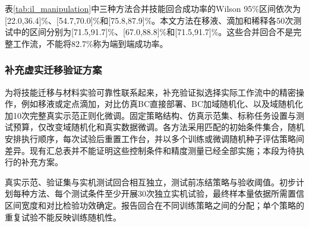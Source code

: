 \begin{table}[!t]
\renewcommand{\arraystretch}{1.3}
\caption{独立技能测试的虚实迁移IL成功率（非完整工作流）}
\label{tab:il_manipulation}
\centering
{}
\end{table}

表\ref{tab:il_manipulation}中三种方法合并技能回合成功率的Wilson 95\%区间依次为[22.0,36.4]\%、[54.7,70.0]\%和[75.8,87.9]\%。本文方法在移液、滴加和稀释各50次测试中的区间分别为[71.5,91.7]\%、[67.0,88.8]\%和[71.5,91.7]\%。这些合并回合不是完整工作流，不能将82.7\%称为端到端成功率。

\subsubsection{补充虚实迁移验证方案}
\label{subsec:transfer_protocol}
为将技能迁移与材料实验可靠性联系起来，补充验证拟选择实际工作流中的精密操作，例如移液或定点滴加，对比仿真BC直接部署、BC加域随机化、以及域随机化加10次完整真实示范正则化微调。固定策略结构、仿真示范集、标称任务设置与测试预算，仅改变域随机化和真实数据微调。各方法采用匹配的初始条件集合，随机安排执行顺序，每次试验后重置工作台，并以多个训练或微调随机种子评估策略间差异。现有汇总表并不能证明这些控制条件和精度测量已经全部实施；本段为待执行的补充方案。

真实示范、验证集与实机测试回合相互独立，测试前冻结策略与验收阈值。初步计划每种方法、每个测试条件至少开展30次独立实机试验，最终样本量依据所需置信区间宽度和对比检验功效确定。报告回合在不同训练策略之间的分配；单个策略的重复试验不能反映训练随机性。

